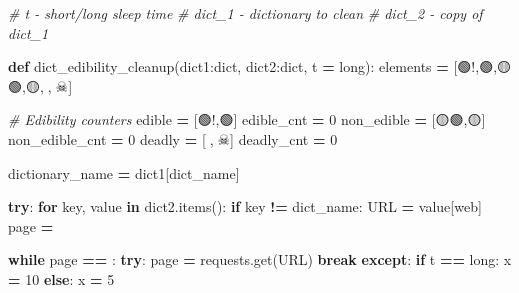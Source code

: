 \documentclass[
]{article}
\newenvironment{Shaded}{\begin{snugshade}}{\end{snugshade}}
\newcommand{\BuiltInTok}[1]{#1}
\newcommand{\CommentTok}[1]{\textcolor[rgb]{0.56,0.35,0.01}{\textit{#1}}}
\newcommand{\ControlFlowTok}[1]{\textcolor[rgb]{0.13,0.29,0.53}{\textbf{#1}}}
\newcommand{\DecValTok}[1]{\textcolor[rgb]{0.00,0.00,0.81}{#1}}
\newcommand{\KeywordTok}[1]{\textcolor[rgb]{0.13,0.29,0.53}{\textbf{#1}}}
\newcommand{\NormalTok}[1]{#1}
\newcommand{\OperatorTok}[1]{\textcolor[rgb]{0.81,0.36,0.00}{\textbf{#1}}}
\newcommand{\StringTok}[1]{\textcolor[rgb]{0.31,0.60,0.02}{#1}}
\begin{document}
\begin{Shaded}
\begin{Highlighting}[]
\CommentTok{\# t {-} short/long sleep time}
\CommentTok{\# dict\_1 {-} dictionary to clean}
\CommentTok{\# dict\_2 {-} copy of dict\_1}

\KeywordTok{def}\NormalTok{ dict\_edibility\_cleanup(dict1:}\BuiltInTok{dict}\NormalTok{, dict2:}\BuiltInTok{dict}\NormalTok{, t }\OperatorTok{=} \StringTok{\textquotesingle{}long\textquotesingle{}}\NormalTok{):}
\NormalTok{    elements }\OperatorTok{=}\NormalTok{ [}\StringTok{\textquotesingle{}🟢!\textquotesingle{}}\NormalTok{,}\StringTok{\textquotesingle{}🟢\textquotesingle{}}\NormalTok{,}\StringTok{\textquotesingle{}🟡🟢\textquotesingle{}}\NormalTok{,}\StringTok{\textquotesingle{}🟡\textquotesingle{}}\NormalTok{,}\StringTok{\textquotesingle{}🔴\textquotesingle{}}\NormalTok{,}\StringTok{\textquotesingle{}🔴☠\textquotesingle{}}\NormalTok{]}

    \CommentTok{\# Edibility counters}
\NormalTok{    edible }\OperatorTok{=}\NormalTok{ [}\StringTok{\textquotesingle{}🟢!\textquotesingle{}}\NormalTok{,}\StringTok{\textquotesingle{}🟢\textquotesingle{}}\NormalTok{]}
\NormalTok{    edible\_cnt }\OperatorTok{=} \DecValTok{0}
\NormalTok{    non\_edible }\OperatorTok{=}\NormalTok{ [}\StringTok{\textquotesingle{}🟡🟢\textquotesingle{}}\NormalTok{,}\StringTok{\textquotesingle{}🟡\textquotesingle{}}\NormalTok{]}
\NormalTok{    non\_edible\_cnt }\OperatorTok{=} \DecValTok{0}
\NormalTok{    deadly }\OperatorTok{=}\NormalTok{ [}\StringTok{\textquotesingle{}🔴\textquotesingle{}}\NormalTok{,}\StringTok{\textquotesingle{}🔴☠\textquotesingle{}}\NormalTok{]}
\NormalTok{    deadly\_cnt }\OperatorTok{=} \DecValTok{0}

\NormalTok{    dictionary\_name }\OperatorTok{=}\NormalTok{ dict1[}\StringTok{\textquotesingle{}dict\_name\textquotesingle{}}\NormalTok{]}

    \ControlFlowTok{try}\NormalTok{:}
        \ControlFlowTok{for}\NormalTok{ key, value }\KeywordTok{in}\NormalTok{ dict2.items():}
            \ControlFlowTok{if}\NormalTok{ key }\OperatorTok{!=} \StringTok{\textquotesingle{}dict\_name\textquotesingle{}}\NormalTok{:}
\NormalTok{                URL }\OperatorTok{=}\NormalTok{ value[}\StringTok{\textquotesingle{}web\textquotesingle{}}\NormalTok{]}
\NormalTok{                page }\OperatorTok{=} \StringTok{\textquotesingle{}\textquotesingle{}}

                \ControlFlowTok{while}\NormalTok{ page }\OperatorTok{==} \StringTok{\textquotesingle{}\textquotesingle{}}\NormalTok{:}
                    \ControlFlowTok{try}\NormalTok{:}
\NormalTok{                        page }\OperatorTok{=}\NormalTok{ requests.get(URL)}
                        \ControlFlowTok{break}
                    \ControlFlowTok{except}\NormalTok{:}
                        \ControlFlowTok{if}\NormalTok{ t }\OperatorTok{==} \StringTok{\textquotesingle{}long\textquotesingle{}}\NormalTok{:}
\NormalTok{                            x }\OperatorTok{=} \DecValTok{10}
                        \ControlFlowTok{else}\NormalTok{:}
\NormalTok{                            x }\OperatorTok{=} \DecValTok{5}


\end{Highlighting}
\end{Shaded}
\end{document}
